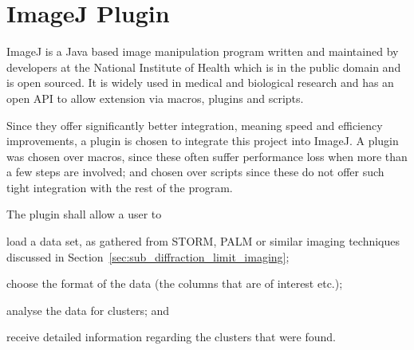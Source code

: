 
\chapter{ImageJ Plugin}
\label{prt:imagej_plugin}

ImageJ is a Java based image manipulation program written and maintained by
developers at the National Institute of Health which is in the public domain
and is open sourced. It is widely used in medical and biological research and
has an open API to allow extension via macros, plugins and scripts.

Since they offer significantly better integration, meaning speed and efficiency
improvements, a plugin is chosen to integrate this project into ImageJ. A
plugin was chosen over macros, since these often suffer performance loss when
more than a few steps are involved; and chosen over scripts since these do not
offer such tight integration with the rest of the program.

The plugin shall allow a user to
\begin{enumerate*}[label=\itshape\alph*\upshape)]
	\item load a data set, as gathered from STORM, PALM or similar imaging
		techniques discussed in
		Section~\ref{sec:sub_diffraction_limit_imaging};
	\item choose the format of the data (the columns that are of interest
		etc.);
	\item analyse the data for clusters; and
	\item receive detailed information regarding the clusters that were found.
\end{enumerate*}
